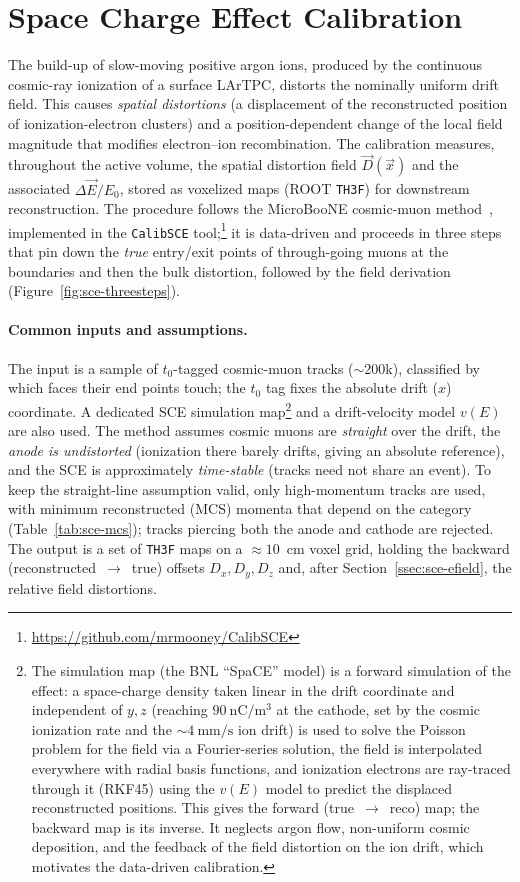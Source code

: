 \section{Space Charge Effect Calibration}
\label{sec:sce-calib}

The build-up of slow-moving positive argon ions, produced by the continuous
cosmic-ray ionization of a surface LArTPC, distorts the nominally uniform drift
field. This causes \emph{spatial distortions} (a displacement of the
reconstructed position of ionization-electron clusters) and a position-dependent
change of the local field magnitude that modifies electron--ion recombination.
The calibration measures, throughout the active volume, the spatial distortion
field $\vec{D}(\vec{x})$ and the associated $\Delta\vec{E}/E_0$, stored as
voxelized maps (ROOT \texttt{TH3F}) for downstream reconstruction. The procedure
follows the MicroBooNE cosmic-muon method~\cite{ub_sce}, implemented in the
\texttt{CalibSCE} tool;\footnote{\url{https://github.com/mrmooney/CalibSCE}} it is
data-driven and proceeds in three steps that pin down the \emph{true}
entry/exit points of through-going muons at the boundaries and then the bulk
distortion, followed by the field derivation (Figure~\ref{fig:sce-threesteps}).

\paragraph{Common inputs and assumptions.}
The input is a sample of $t_0$-tagged cosmic-muon tracks ($\sim$200k),
classified by which faces their end points touch; the $t_0$ tag fixes the
absolute drift ($x$) coordinate. A dedicated SCE simulation
map\footnote{The simulation map (the BNL ``SpaCE'' model) is a forward
simulation of the effect: a space-charge density taken linear in the drift
coordinate and independent of $y,z$ (reaching $90~\mathrm{nC/m^3}$ at the
cathode, set by the cosmic ionization rate and the $\sim 4~\mathrm{mm/s}$ ion
drift) is used to solve the Poisson problem for the field via a Fourier-series
solution, the field is interpolated everywhere with radial basis functions, and
ionization electrons are ray-traced through it (RKF45) using the $v(E)$ model to
predict the displaced reconstructed positions. This gives the forward
(true~$\rightarrow$~reco) map; the backward map is its inverse. It neglects
argon flow, non-uniform cosmic deposition, and the feedback of the field
distortion on the ion drift, which motivates the data-driven calibration.}
and a drift-velocity model $v(E)$ are also used. The method assumes cosmic muons
are \emph{straight} over the drift, the \emph{anode is undistorted} (ionization
there barely drifts, giving an absolute reference), and the SCE is
approximately \emph{time-stable} (tracks need not share an event). To keep the
straight-line assumption valid, only high-momentum tracks are used, with minimum
reconstructed (MCS) momenta that depend on the category
(Table~\ref{tab:sce-mcs}); tracks piercing both the anode and cathode are
rejected. The output is a set of \texttt{TH3F} maps on a $\approx 10$~cm voxel
grid, holding the backward (reconstructed~$\rightarrow$~true) offsets
$D_x,D_y,D_z$ and, after Section~\ref{ssec:sce-efield}, the relative field
distortions.

